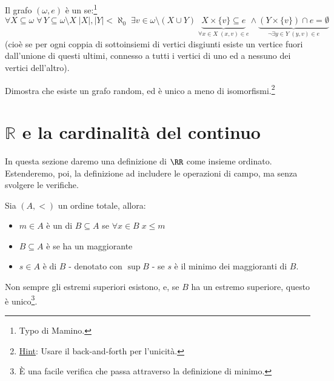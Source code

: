 \documentclass[11pt]{scrartcl}
\begin{document}
\begin{definition}
	Il grafo $(\omega,e)$ è un  se:\footnote{Typo di Mamino.}
	\[ \forall X \subseteq \omega \; \forall \,Y \subseteq \omega\setminus X \; |X|,|Y|<\aleph_0\; \exists v \in \omega \setminus(X \cup Y) \; \underbrace{X \times \{v\} \subseteq e}_{\forall x\in X \; (x,v) \in e} \land \underbrace{(Y \times \{v\}) \cap e = \emptyset}_{\neg\exists y \in Y \; (y,v) \in e}
		\]
	(cioè se per ogni coppia di sottoinsiemi di vertici disgiunti esiste un vertice fuori dall'unione di questi ultimi, connesso a tutti i vertici di uno ed a nessuno dei vertici dell'altro).
\end{definition}

\begin{exercise}
	Dimostra che esiste un grafo random, ed è unico a meno di isomorfismi.\footnote{\underline{Hint}: Usare il back-and-forth per l'unicità.}
\end{exercise}

\begin{soln}
	
\end{soln}

\newpage
\section{\texorpdfstring{$\mathbb{R}$ e la cardinalità del continuo}{R e la cardinalità del continuo}}

In questa sezione daremo una definizione di $\RR$ come insieme ordinato. Estenderemo, poi, la definizione ad includere le operazioni di campo, ma senza svolgere le verifiche.

\begin{definition}
	Sia $(A,<)$ un ordine totale, allora:
	\begin{itemize}
		\item $m \in A$ è un  di $B \subseteq A$ se $\forall x \in B \; x \leq m$
		\item $B \subseteq A$ è  se ha un maggiorante
		\item $s\in A$ è  di $B$ - denotato con $\sup B$ - se $s$ è il minimo dei maggioranti di $B$.
	\end{itemize}
\end{definition}

\begin{note}
	Non sempre gli estremi superiori esistono, e, se $B$ ha un estremo superiore, questo è unico\footnote{È una facile verifica che passa attraverso la definizione di minimo.}.
\end{note}
\end{document}
